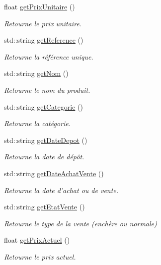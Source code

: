 \begin{DoxyCompactItemize}
float \hyperlink{class_produit_ae9e421815cd947b5ef56b751272a34ca}{get\-Prix\-Unitaire} ()
\begin{DoxyCompactList}\small\item\em Retourne le prix unitaire. \end{DoxyCompactList}\item 
std\-::string \hyperlink{class_produit_aaad2134211bc9caebb1abcefe5e096c5}{get\-Reference} ()
\begin{DoxyCompactList}\small\item\em Retourne la référence unique. \end{DoxyCompactList}\item 
std\-::string \hyperlink{class_produit_a6e4b2da75ac7c667bf1f70c124aea0ef}{get\-Nom} ()
\begin{DoxyCompactList}\small\item\em Retourne le nom du produit. \end{DoxyCompactList}\item 
std\-::string \hyperlink{class_produit_a9eff46fd98f73089223b7797a79f1a6c}{get\-Categorie} ()
\begin{DoxyCompactList}\small\item\em Retourne la catégorie. \end{DoxyCompactList}\item 
std\-::string \hyperlink{class_produit_af4d4f3cc1b83dbc521965ef3832f55db}{get\-Date\-Depot} ()
\begin{DoxyCompactList}\small\item\em Retourne la date de dépôt. \end{DoxyCompactList}\item 
std\-::string \hyperlink{class_produit_aa7f00c40483d9035023d5e2bfa3f7154}{get\-Date\-Achat\-Vente} ()
\begin{DoxyCompactList}\small\item\em Retourne la date d'achat ou de vente. \end{DoxyCompactList}\item 
std\-::string \hyperlink{class_produit_aa0421a8a8a05684059fa5c26fc6b09e5}{get\-Etat\-Vente} ()
\begin{DoxyCompactList}\small\item\em Retourne le type de la vente (enchère ou normale) \end{DoxyCompactList}\item 
float \hyperlink{class_produit_a8df31b7e2ca9fc0cf330cbed2efd22d0}{get\-Prix\-Actuel} ()
\begin{DoxyCompactList}\small\item\em Retourne le prix actuel. \end{DoxyCompactList}\item 

\end{DoxyCompactItemize}
